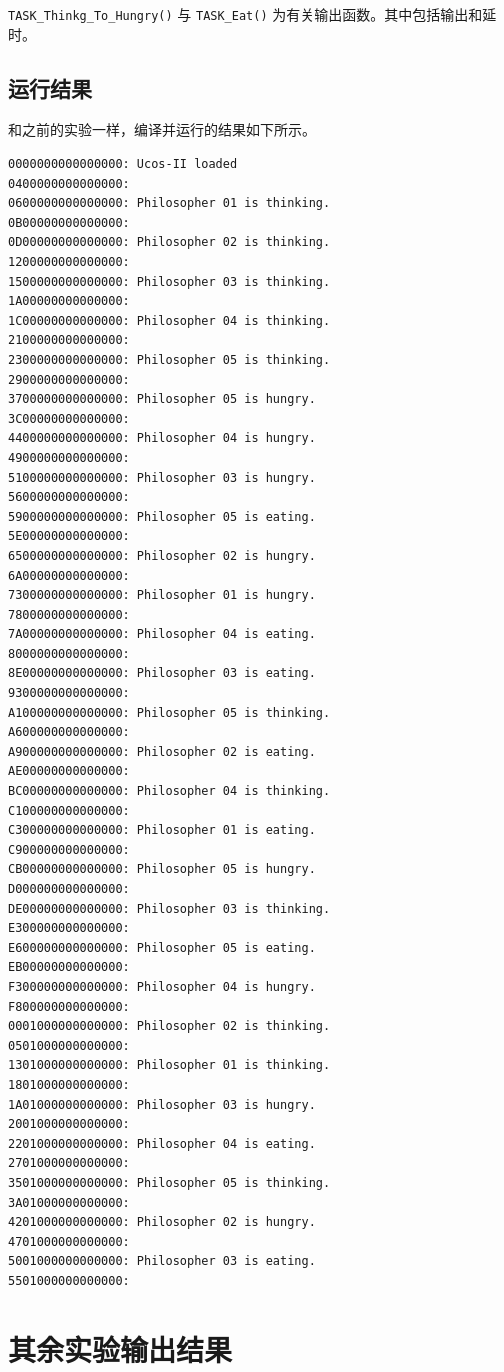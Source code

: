 \documentclass{ctexart}
\begin{document}
    \lstinline|TASK_Thinkg_To_Hungry()| 与 \lstinline|TASK_Eat()| 为有关输出函数。其中包括输出和延时。
    
    \subsection{运行结果}
    
    和之前的实验一样，编译并运行的结果如下所示。
    \begin{lstlisting}[language={}]
0000000000000000: Ucos-II loaded
0400000000000000:
0600000000000000: Philosopher 01 is thinking.
0B00000000000000:
0D00000000000000: Philosopher 02 is thinking.
1200000000000000:
1500000000000000: Philosopher 03 is thinking.
1A00000000000000:
1C00000000000000: Philosopher 04 is thinking.
2100000000000000:
2300000000000000: Philosopher 05 is thinking.
2900000000000000:
3700000000000000: Philosopher 05 is hungry.
3C00000000000000:
4400000000000000: Philosopher 04 is hungry.
4900000000000000:
5100000000000000: Philosopher 03 is hungry.
5600000000000000:
5900000000000000: Philosopher 05 is eating.
5E00000000000000:
6500000000000000: Philosopher 02 is hungry.
6A00000000000000:
7300000000000000: Philosopher 01 is hungry.
7800000000000000:
7A00000000000000: Philosopher 04 is eating.
8000000000000000:
8E00000000000000: Philosopher 03 is eating.
9300000000000000:
A100000000000000: Philosopher 05 is thinking.
A600000000000000:
A900000000000000: Philosopher 02 is eating.
AE00000000000000:
BC00000000000000: Philosopher 04 is thinking.
C100000000000000:
C300000000000000: Philosopher 01 is eating.
C900000000000000:
CB00000000000000: Philosopher 05 is hungry.
D000000000000000:
DE00000000000000: Philosopher 03 is thinking.
E300000000000000:
E600000000000000: Philosopher 05 is eating.
EB00000000000000:
F300000000000000: Philosopher 04 is hungry.
F800000000000000:
0001000000000000: Philosopher 02 is thinking.
0501000000000000:
1301000000000000: Philosopher 01 is thinking.
1801000000000000:
1A01000000000000: Philosopher 03 is hungry.
2001000000000000:
2201000000000000: Philosopher 04 is eating.
2701000000000000:
3501000000000000: Philosopher 05 is thinking.
3A01000000000000:
4201000000000000: Philosopher 02 is hungry.
4701000000000000:
5001000000000000: Philosopher 03 is eating.
5501000000000000:
    \end{lstlisting}
    
    
    \section{其余实验输出结果}
    
\end{document}
